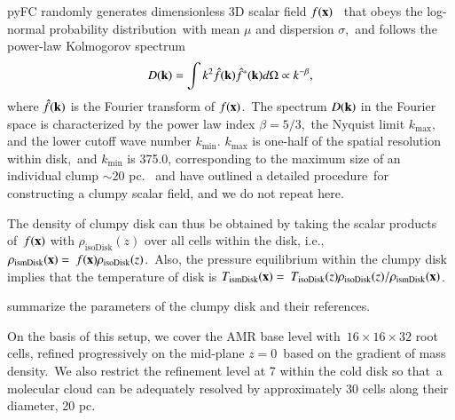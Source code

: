 \documentclass[twocolumn]{aastex631}
\begin{document}
  pyFC randomly generates dimensionless 3D scalar field $f(\bold{x})$\ %
  that obeys the log-normal probability distribution\
  with mean $\mu$ and dispersion $\sigma$,\
  and follows the power-law Kolmogorov spectrum
  \begin{equation}
    D(\bold{k})=\int k^{2} \hat{f}(\bold{k})\hat{f}^{*}(\bold{k})d\Omega \propto k^{-\beta},
    \label{Kolmogorov-spectrum}
  \end{equation}
  where $\hat{f}(\bold{k})$ is the Fourier transform of $f(\bold{x})$.\
  The spectrum $D(\bold{k})$ in the Fourier space is characterized by the power law index $\beta=5/3$,\
  the Nyquist limit $k_{\text{max}}$, and the lower cutoff wave number $k_{\text{min}}$.
  $k_{\text{max}}$ is one-half of the spatial resolution within disk,\
  and $k_{\text{min}}$ is 375.0, corresponding to the maximum size of an individual clump $\sim 20$ pc.\
  \citet{LA2002} and \citet{Wagner2012} have outlined a detailed procedure\
  for constructing a clumpy scalar field, and we do not repeat here.

  The density of clumpy disk can thus be obtained by taking the scalar products of\
  $f(\bold{x})$ with $\rho_{\text{isoDisk}}(z)$ over all cells within the disk, i.e.,\
  $\displaystyle\rho_{\text{ismDisk}}(\bold{x}) =\
  f(\bold{x}) \rho_{\text{isoDisk}}(z)$.\
  Also, the pressure equilibrium within the clumpy disk implies that the temperature of disk is
  $\displaystyle T_{\text{ismDisk}}(\bold{x}) =\
  T_{\text{isoDisk}}(z)\rho_{\text{isoDisk}}(z)/\rho_{\text{ismDisk}}(\bold{x})$.



  \Cref{table-parameters} summarize the parameters of the clumpy disk and their references.

  On the basis of this setup, we cover the AMR base level with\
  $16\times16\times32$ root cells, refined progressively on the mid-plane $z=0$\
  based on the gradient of mass density.\
  We also restrict the refinement level at 7 within the cold disk so that\
  a molecular cloud can be adequately resolved by approximately 30 cells along their diameter, 20 pc.
\end{document}
